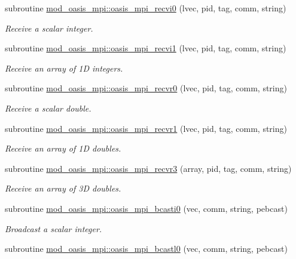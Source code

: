 \begin{DoxyCompactItemize}
subroutine \hyperlink{namespacemod__oasis__mpi_ad89796f10a2225d4930cdec65546cf98}{mod\+\_\+oasis\+\_\+mpi\+::oasis\+\_\+mpi\+\_\+recvi0} (lvec, pid, tag, comm, string)
\begin{DoxyCompactList}\small\item\em Receive a scalar integer. \end{DoxyCompactList}\item 
subroutine \hyperlink{namespacemod__oasis__mpi_acf13ea626ed09fe98123f23d0990879d}{mod\+\_\+oasis\+\_\+mpi\+::oasis\+\_\+mpi\+\_\+recvi1} (lvec, pid, tag, comm, string)
\begin{DoxyCompactList}\small\item\em Receive an array of 1D integers. \end{DoxyCompactList}\item 
subroutine \hyperlink{namespacemod__oasis__mpi_a2578d560c80d608340b5a49b327642ba}{mod\+\_\+oasis\+\_\+mpi\+::oasis\+\_\+mpi\+\_\+recvr0} (lvec, pid, tag, comm, string)
\begin{DoxyCompactList}\small\item\em Receive a scalar double. \end{DoxyCompactList}\item 
subroutine \hyperlink{namespacemod__oasis__mpi_a2bbd8de453167b4c73aa09c3c44c0ca8}{mod\+\_\+oasis\+\_\+mpi\+::oasis\+\_\+mpi\+\_\+recvr1} (lvec, pid, tag, comm, string)
\begin{DoxyCompactList}\small\item\em Receive an array of 1D doubles. \end{DoxyCompactList}\item 
subroutine \hyperlink{namespacemod__oasis__mpi_a2c3b82d2346a69cd20be3d35c5e70be6}{mod\+\_\+oasis\+\_\+mpi\+::oasis\+\_\+mpi\+\_\+recvr3} (array, pid, tag, comm, string)
\begin{DoxyCompactList}\small\item\em Receive an array of 3D doubles. \end{DoxyCompactList}\item 
subroutine \hyperlink{namespacemod__oasis__mpi_af8bc029a22d59f1188b7f8a1a2645c40}{mod\+\_\+oasis\+\_\+mpi\+::oasis\+\_\+mpi\+\_\+bcasti0} (vec, comm, string, pebcast)
\begin{DoxyCompactList}\small\item\em Broadcast a scalar integer. \end{DoxyCompactList}\item 
subroutine \hyperlink{namespacemod__oasis__mpi_a1426590a36b24f1770381b9c35563cff}{mod\+\_\+oasis\+\_\+mpi\+::oasis\+\_\+mpi\+\_\+bcastl0} (vec, comm, string, pebcast)

\end{DoxyCompactItemize}
